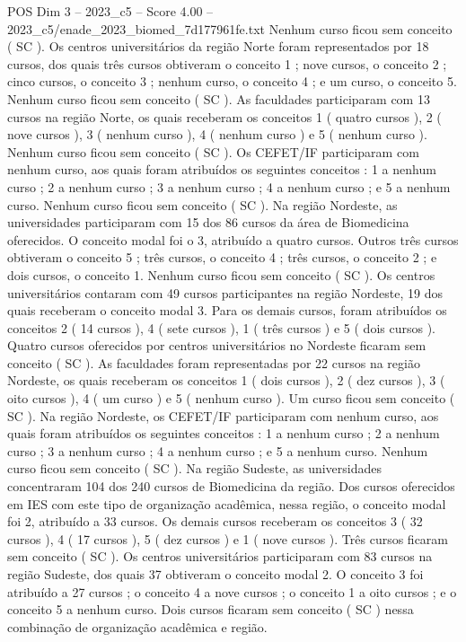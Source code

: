 \begin{textsample}{POS Dim 3 – 2023\_c5 – Score 4.00 – 2023\_c5/enade\_2023\_biomed\_7d177961fe.txt}
Nenhum curso ficou sem conceito ( SC ).
Os centros universitários da região Norte foram representados por 18 cursos, dos quais três cursos obtiveram o conceito 1 ; nove cursos, o conceito 2 ; cinco cursos, o conceito 3 ; nenhum curso, o conceito 4 ; e um curso, o conceito 5.
Nenhum curso ficou sem conceito ( SC ).
As faculdades participaram com 13 cursos na região Norte, os quais receberam os conceitos 1 ( quatro cursos ), 2 ( nove cursos ), 3 ( nenhum curso ), 4 ( nenhum curso ) e 5 ( nenhum curso ).
Nenhum curso ficou sem conceito ( SC ).
Os CEFET/IF participaram com nenhum curso, aos quais foram atribuídos os seguintes conceitos : 1 a nenhum curso ; 2 a nenhum curso ; 3 a nenhum curso ; 4 a nenhum curso ; e 5 a nenhum curso.
Nenhum curso ficou sem conceito ( SC ).
Na região Nordeste, as universidades participaram com 15 dos 86 cursos da área de Biomedicina oferecidos.
O conceito modal foi o 3, atribuído a quatro cursos.
Outros três cursos obtiveram o conceito 5 ; três cursos, o conceito 4 ; três cursos, o conceito 2 ; e dois cursos, o conceito 1.
Nenhum curso ficou sem conceito ( SC ).
Os centros universitários contaram com 49 cursos participantes na região Nordeste, 19 dos quais receberam o conceito modal 3.
Para os demais cursos, foram atribuídos os conceitos 2 ( 14 cursos ), 4 ( sete cursos ), 1 ( três cursos ) e 5 ( dois cursos ).
Quatro cursos oferecidos por centros universitários no Nordeste ficaram sem conceito ( SC ).
As faculdades foram representadas por 22 cursos na região Nordeste, os quais receberam os conceitos 1 ( dois cursos ), 2 ( dez cursos ), 3 ( oito cursos ), 4 ( um curso ) e 5 ( nenhum curso ).
Um curso ficou sem conceito ( SC ).
Na região Nordeste, os CEFET/IF participaram com nenhum curso, aos quais foram atribuídos os seguintes conceitos : 1 a nenhum curso ; 2 a nenhum curso ; 3 a nenhum curso ; 4 a nenhum curso ; e 5 a nenhum curso.
Nenhum curso ficou sem conceito ( SC ).
Na região Sudeste, as universidades concentraram 104 dos 240 cursos de Biomedicina da região.
Dos cursos oferecidos em IES com este tipo de organização acadêmica, nessa região, o conceito modal foi 2, atribuído a 33 cursos.
Os demais cursos receberam os conceitos 3 ( 32 cursos ), 4 ( 17 cursos ), 5 ( dez cursos ) e 1 ( nove cursos ).
Três cursos ficaram sem conceito ( SC ).
Os centros universitários participaram com 83 cursos na região Sudeste, dos quais 37 obtiveram o conceito modal 2.
O conceito 3 foi atribuído a 27 cursos ; o conceito 4 a nove cursos ; o conceito 1 a oito cursos ; e o conceito 5 a nenhum curso.
Dois cursos ficaram sem conceito ( SC ) nessa combinação de organização acadêmica e região.

\end{textsample}
